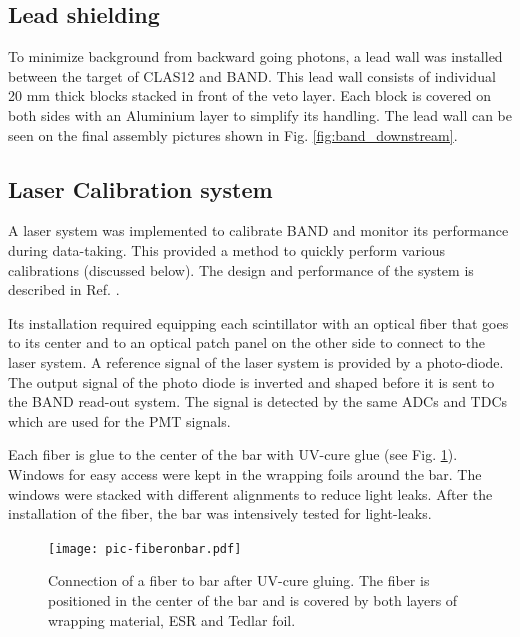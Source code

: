 \documentclass[3p,final,twocolumn]{elsarticle}
\begin{document}
\subsection{Lead shielding}
To minimize background from backward going photons, a lead wall was installed between the target of CLAS12 and BAND. This lead wall consists of individual 20 \si{\milli\meter} thick blocks stacked in front of the veto layer. Each block is covered on both sides with an Aluminium layer to simplify its handling. The lead wall can be seen on the final assembly pictures shown in Fig. \ref{fig:band_downstream}.



\subsection{Laser Calibration system}
\label{sec:laserystem}
A laser system was implemented to calibrate BAND and monitor its performance during data-taking. This 
provided a method to quickly perform various calibrations (discussed below). The design and performance of the system is described in Ref. \cite{band-laser}. 

Its installation required equipping each scintillator with an optical fiber that goes to its center and to an optical patch panel on the other side to connect to the laser system.
A reference signal of the laser system is provided by a photo-diode. The output signal of the photo diode is inverted and shaped before it is sent to the BAND read-out system. The signal is detected by the same ADCs and TDCs which are used for the PMT signals.

Each fiber is glue to the center of the bar with UV-cure glue (see Fig. \ref{fig:pic-fiberonbar}). Windows for easy access were kept in the wrapping foils around the bar. The windows were stacked with different alignments to reduce light leaks. After the installation of the fiber, the bar was intensively tested for light-leaks.
\begin{figure}[tb]
	\centering
		\texttt{[image: pic-fiberonbar.pdf]}
	\caption{Connection of a fiber to bar after UV-cure gluing. The fiber is positioned in the center of the bar and is covered by both layers of wrapping material, ESR \cite{3MESR} and Tedlar foil.}
	\label{fig:pic-fiberonbar}
\end{figure}
\end{document}
